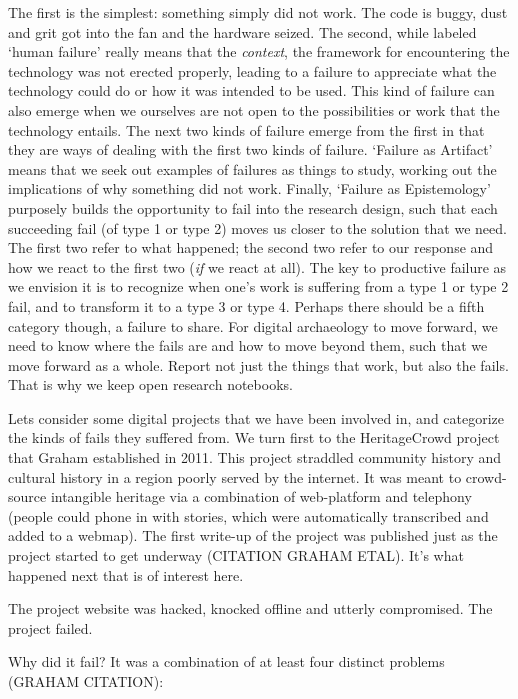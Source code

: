 \documentclass[english,]{book}
\begin{document}
The first is the simplest: something simply did not work. The code is
buggy, dust and grit got into the fan and the hardware seized. The
second, while labeled `human failure' really means that the
\emph{context}, the framework for encountering the technology was not
erected properly, leading to a failure to appreciate what the technology
could do or how it was intended to be used. This kind of failure can
also emerge when we ourselves are not open to the possibilities or work
that the technology entails. The next two kinds of failure emerge from
the first in that they are ways of dealing with the first two kinds of
failure. `Failure as Artifact' means that we seek out examples of
failures as things to study, working out the implications of why
something did not work. Finally, `Failure as Epistemology' purposely
builds the opportunity to fail into the research design, such that each
succeeding fail (of type 1 or type 2) moves us closer to the solution
that we need. The first two refer to what happened; the second two refer
to our response and how we react to the first two (\emph{if} we react at
all). The key to productive failure as we envision it is to recognize
when one's work is suffering from a type 1 or type 2 fail, and to
transform it to a type 3 or type 4. Perhaps there should be a fifth
category though, a failure to share. For digital archaeology to move
forward, we need to know where the fails are and how to move beyond
them, such that we move forward as a whole. Report not just the things
that work, but also the fails. That is why we keep open research
notebooks.

Lets consider some digital projects that we have been involved in, and
categorize the kinds of fails they suffered from. We turn first to the
HeritageCrowd project that Graham established in 2011. This project
straddled community history and cultural history in a region poorly
served by the internet. It was meant to crowd-source intangible heritage
via a combination of web-platform and telephony (people could phone in
with stories, which were automatically transcribed and added to a
webmap). The first write-up of the project was published just as the
project started to get underway (CITATION GRAHAM ETAL). It's what
happened next that is of interest here.

The project website was hacked, knocked offline and utterly compromised.
The project failed.

Why did it fail? It was a combination of at least four distinct problems
(GRAHAM CITATION):
\end{document}
